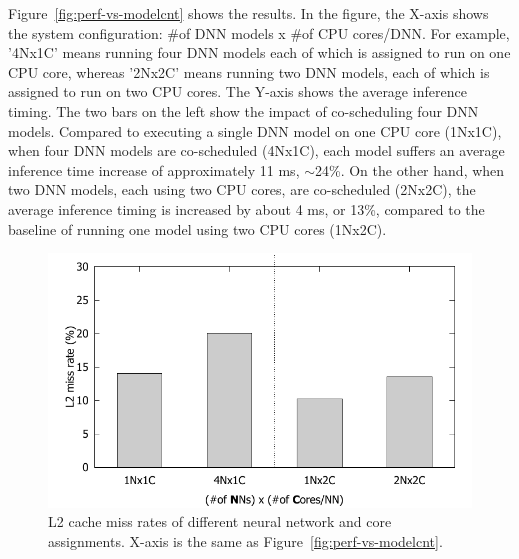 Figure~\ref{fig:perf-vs-modelcnt} shows the results. In the figure, the
X-axis shows the system configuration: \#of DNN models x \#of CPU
cores/DNN. For example, '4Nx1C' means running four DNN models each of
which is assigned to run on one CPU core, whereas '2Nx2C' means running
two DNN models, each of which is assigned to run on two CPU
cores. The Y-axis shows the average inference timing.
The two bars on the left show the impact of co-scheduling four DNN
models. Compared to executing a single DNN model on one CPU core
(1Nx1C), when four DNN models are co-scheduled (4Nx1C), each model
suffers an average inference time increase of approximately 11 ms,
$\sim$24\%. On the other hand, when two DNN models, each using two CPU
cores, are co-scheduled (2Nx2C), the average inference timing is increased by
about 4 ms, or 13\%, compared to the baseline of running one model
using two CPU cores (1Nx2C). 

\begin{figure}[h]
  \centering
  \includegraphics[width=.7\textwidth]{figs/l2missrate_vs_modelcnt}
  \caption{L2 cache miss rates of different neural network and core
    assignments. X-axis is the same as Figure~\ref{fig:perf-vs-modelcnt}.} 
  \label{fig:l2missrate-vs-modelcnt}
\end{figure}

